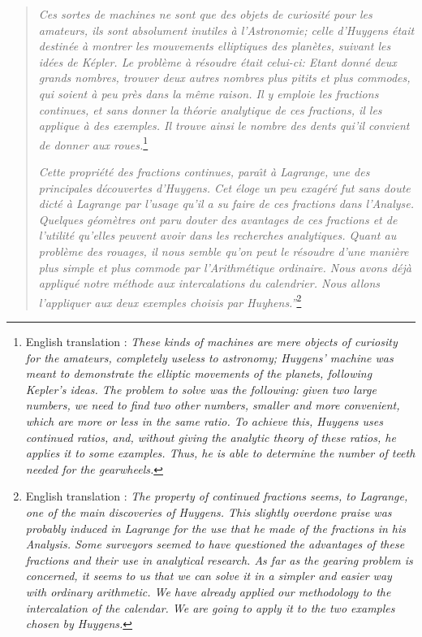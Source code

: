 \begin{quote}
\emph{Ces sortes de machines ne sont que des objets de
curiosit\'e pour les amateurs, ils sont absolument inutiles
\`a l'Astronomie; celle d'Huygens 
\'etait destin\'ee \`a montrer
les mouvements elliptiques des plan\`etes, suivant les id\'ees
de K\'epler.  Le probl\`eme \`a r\'esoudre \'etait celui-ci:
Etant donn\'e deux grands nombres, trouver deux autres nombres plus 
pitits et plus commodes, qui soient \`a peu pr\`es dans la m\^eme raison.  
Il y emploie les fractions continues, et sans donner la
th\'eorie analytique de ces fractions, il les applique \`a des
exemples.  Il trouve ainsi le nombre des dents qui'il convient de donner
aux roues.}\footnote{English translation 
\cite{bibref:i:sandrinederaspide}:  \emph{These kinds of machines are 
mere objects of curiosity for the amateurs, completely useless to astronomy;  
Huygens' machine was meant to demonstrate the elliptic movements of the 
planets, following Kepler's ideas.  The problem to solve was the following: 
given two large numbers, we need to find two other numbers, smaller and 
more convenient, which are more or less in the same ratio.  To achieve 
this, Huygens uses continued ratios, and, without giving the analytic 
theory of these ratios, he applies it to some examples.  Thus, he is able 
to determine the number of teeth needed for the gearwheels.}}

\emph{Cette propri\'et\'e des fractions continues, para\^{\i}t \`a
Lagrange, une des principales d\'ecouvertes 
d'Huygens.  Cet \'eloge 
un peu exag\'er\'e fut sans doute dict\'e \`a
Lagrange par l'usage qu'il a su faire de ces fractions dans l'Analyse.
Quelques g\'eom\`etres ont paru douter des avantages de ces fractions et
de l'utilit\'e
qu'elles peuvent avoir dans les recherches analytiques.  Quant au
probl\`eme des rouages, il nous semble qu'on peut le r\'esoudre d'une 
mani\`ere plus simple et plus commode par l'Arithm\'etique ordinaire.
Nous avons d\'ej\`a appliqu\'e notre m\'ethode
aux intercalations du calendrier.  Nous allons l'appliquer aux deux
exemples choisis par Huyhens.''}\footnote{English 
translation 
\cite{bibref:i:sandrinederaspide}:
\emph{The property of continued fractions seems, to Lagrange, 
one of the main discoveries of Huygens.  This slightly overdone 
praise was probably induced in Lagrange for the use that he made of 
the fractions in his Analysis.  Some surveyors seemed to have questioned 
the advantages of these fractions and their use in analytical research.  
As far as the gearing problem is concerned, it seems to us that we can 
solve it in a simpler and easier way with ordinary arithmetic.  
We have already applied our methodology to the intercalation of the calendar.  
We are going to apply it to the two examples chosen by Huygens.}}


\end{quote}
